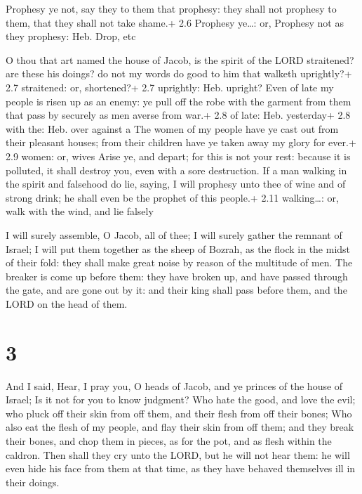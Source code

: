  Prophesy ye not, say they to them that prophesy: they shall
not prophesy to them, that they shall not take shame.+ 2.6 Prophesy
ye\ldots: or, Prophesy not as they prophesy: Heb. Drop, etc

 O thou that art named the house of Jacob, is the spirit
of the LORD straitened? are these his doings? do not my words do good to
him that walketh uprightly?+ 2.7 straitened: or, shortened?+ 2.7
uprightly: Heb. upright?  Even of late my people is risen up
as an enemy: ye pull off the robe with the garment from them that pass
by securely as men averse from war.+ 2.8 of late: Heb. yesterday+ 2.8
with the: Heb. over against a  The women of my people have
ye cast out from their pleasant houses; from their children have ye
taken away my glory for ever.+ 2.9 women: or, wives  Arise
ye, and depart; for this is not your rest: because it is polluted, it
shall destroy you, even with a sore destruction.  If a man
walking in the spirit and falsehood do lie, saying, I will prophesy unto
thee of wine and of strong drink; he shall even be the prophet of this
people.+ 2.11 walking\ldots: or, walk with the wind, and lie falsely

 I will surely assemble, O Jacob, all of thee; I will
surely gather the remnant of Israel; I will put them together as the
sheep of Bozrah, as the flock in the midst of their fold: they shall
make great noise by reason of the multitude of men.  The
breaker is come up before them: they have broken up, and have passed
through the gate, and are gone out by it: and their king shall pass
before them, and the LORD on the head of them.

\hypertarget{section-2}{%
\section{3}\label{section-2}}

 And I said, Hear, I pray you, O heads of Jacob, and ye
princes of the house of Israel; Is it not for you to know judgment?
 Who hate the good, and love the evil; who pluck off their
skin from off them, and their flesh from off their bones; 
Who also eat the flesh of my people, and flay their skin from off them;
and they break their bones, and chop them in pieces, as for the pot, and
as flesh within the caldron.  Then shall they cry unto the
LORD, but he will not hear them: he will even hide his face from them at
that time, as they have behaved themselves ill in their doings.

